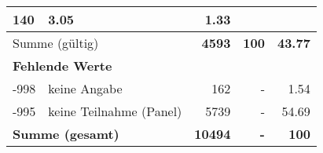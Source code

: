 \begin{longtable}{lXrrr}
       \num{140} &
       \num[round-mode=places,round-precision=2]{3.05} &
         \num[round-mode=places,round-precision=2]{1.33} \\
     \midrule
     \multicolumn{2}{l}{Summe (gültig)} &
       \textbf{\num{4593}} &
     \textbf{\num{100}} &
       \textbf{\num[round-mode=places,round-precision=2]{43.77}} \\
     \multicolumn{5}{l}{\textbf{Fehlende Werte}}\\
       -998 &
       keine Angabe &
         \num{162} &
        - &
         \num[round-mode=places,round-precision=2]{1.54} \\
       -995 &
       keine Teilnahme (Panel) &
         \num{5739} &
        - &
         \num[round-mode=places,round-precision=2]{54.69} \\
     \midrule
     \multicolumn{2}{l}{\textbf{Summe (gesamt)}} &
          \textbf{\num{10494}} &
        \textbf{-} &
        \textbf{\num{100}} \\
     \bottomrule
     \end{longtable}
     
